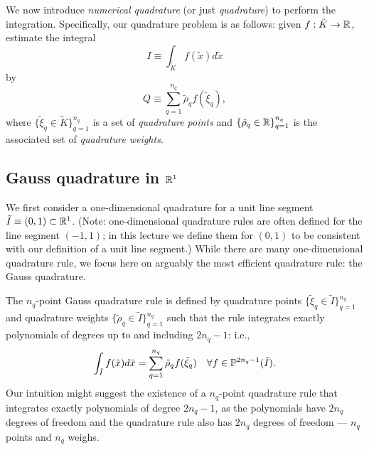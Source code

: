 We now introduce \emph{numerical quadrature} (or just \emph{quadrature}) to perform the integration.  Specifically, our quadrature problem is as follows: given $f: \tilde K \to \mathbb{R}$, estimate the integral
\begin{equation*}
  I \equiv \int_{\tilde K} f(\tilde x) d \tilde x
\end{equation*}
by
\begin{equation*}
  Q \equiv \sum_{q=1}^{n_q} \tilde \rho_q f(\tilde \xi_q),
\end{equation*}
where $\{\tilde \xi_q \in \tilde K \}_{q=1}^{n_q}$ is a set of \emph{quadrature points} and $\{\tilde \rho_q \in \mathbb{R} \}_{q=1}^{n_q}$ is the associated set of \emph{quadrature weights}.

\subsection{Gauss quadrature in $\mathbb{R}^1$}
\label{sec:fe_quad_1d}
We first consider a one-dimensional quadrature for a unit line segment $\tilde I \equiv (0,1) \subset \mathbb{R}^1$.  (Note: one-dimensional quadrature rules are often defined for the line segment $(-1,1)$; in this lecture we define them for $(0,1)$ to be consistent with our definition of a unit line segment.)  While there are many one-dimensional quadrature rule, we focus here on arguably the most efficient quadrature rule: the Gauss quadrature.

The $n_q$-point Gauss quadrature rule is defined by quadrature points $\{\tilde \xi_q \in \tilde I \}_{q=1}^{n_q}$ and quadrature weights $\{ \tilde \rho_q \in \tilde I \}_{q=1}^{n_q}$ such that the rule integrates exactly polynomials of degrees up to and including $2n_q - 1$: i.e.,
\begin{equation}
  \int_{\tilde I} f(\tilde x) d\tilde x = \sum_{q=1}^{n_q} \tilde \rho_q f(\tilde \xi_q) \quad \forall f \in \mathbb{P}^{2n_q-1}(\tilde I).
  \label{eq:fe_impl_gauss_cond}
\end{equation}
Our intuition might suggest the existence of a $n_q$-point quadrature rule that integrates exactly polynomials of degree $2n_q-1$, as the polynomials have $2n_q$ degrees of freedom and the quadrature rule also has $2n_q$ degrees of freedom --- $n_q$ points and $n_q$ weighs.


